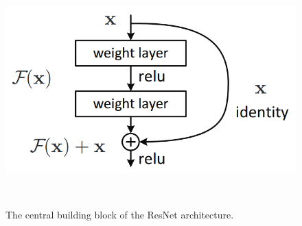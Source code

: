 \begin{figure}[!htbp]
  \centering
  \includegraphics[width=.6\linewidth]{figures/spp/residual_block_he.png}
  \caption[ResNet Block]{The central building block of the ResNet architecture.\footnotemark}
~\label{figure:moseg_truncation}
\end{figure}
~
